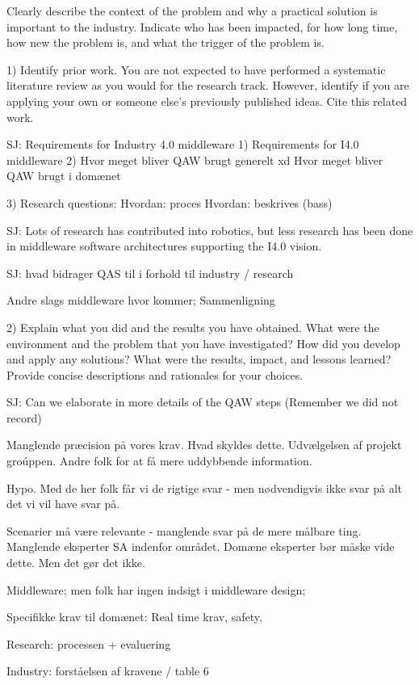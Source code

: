  Clearly describe the context of the problem and why a practical solution is important to the industry. Indicate who has been impacted, for how long time, how new the problem is, and what the trigger of the problem is.
 

 1) Identify prior work. You are not expected to have performed a systematic literature review as you would for the research track. However, identify if you are applying your own or someone else’s previously published ideas. Cite this related work.
 
 SJ: Requirements for Industry 4.0 middleware
 1)
 Requirements for I4.0 middleware 
 2)
 Hvor meget bliver QAW brugt generelt xd
 Hvor meget bliver QAW brugt i domænet
 
 3)
 Research questions:
 Hvordan: proces
 Hvordan: beskrives (bass)
 
 
 SJ: Lots of research has contributed into robotics, but less research has been done in middleware software architectures supporting the I4.0 vision.
 
 SJ: hvad bidrager QAS til i forhold til industry / research
 
 
 Andre slags middleware hvor kommer;
 Sammenligning
 
 2) Explain what you did and the results you have obtained. What were the environment and the problem that you have investigated? How did you develop and apply any solutions? What were the results, impact, and lessons learned? Provide concise descriptions and rationales for your choices.
 
 SJ: Can we elaborate in more details of the QAW steps (Remember we did not record)
 
 Manglende præcision på vores krav. Hvad skyldes dette. Udvælgelsen af projekt groúppen. Andre folk for at få mere uddybbende information.
 
 Hypo. Med de her folk får vi de rigtige svar - men nødvendigvis ikke svar på alt det vi vil have svar på.
 
 Scenarier må være relevante - manglende svar på de mere målbare ting. Manglende eksperter SA indenfor området. Domæne eksperter bør måske vide dette. Men det gør det ikke.
 
 Middleware; men folk har ingen indsigt i middleware design; 
 
 Specifikke krav til domænet: Real time krav, safety, 
 
 Research: processen + evaluering 
 
 Industry:  forståelsen af kravene / table 6
 
